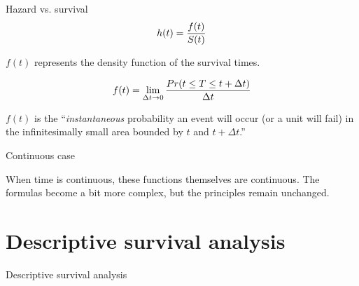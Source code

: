 \documentclass[12pt,english,pdf,xcolor=dvipsnames,aspectratio=169]{beamer}\usepackage[]{graphicx}\usepackage[]{xcolor}
\begin{document}
\begin{frame}{Hazard vs. survival}
\begin{equation}
\centering
h(t)=\frac{f(t)}{S(t)}
\end{equation}

$f(t)$ represents the density function of the survival times.\bigskip

\begin{equation}
\centering
f(t)=\lim_{\Delta t \to 0}\frac{Pr(t \leq T \leq t+\Delta t)}{\Delta t}
\end{equation}

$f(t)$ is the ``\textit{instantaneous} probability an event will occur (or a unit will fail) in the infinitesimally small area bounded by $t$ and $t+\Delta t$.'' \cite[p.~13]{BoxSteffensmeier2004}
\end{frame}



\begin{frame}{Continuous case}

\begin{figure}
\centering
{}
\end{figure}

When time is continuous, these functions themselves are continuous. The formulas become a bit more complex, but the principles remain unchanged.
\end{frame}


\section{Descriptive survival analysis}

\begin{frame}
\begin{center}
\huge Descriptive survival analysis
\end{center}
\end{frame}
\end{document}
